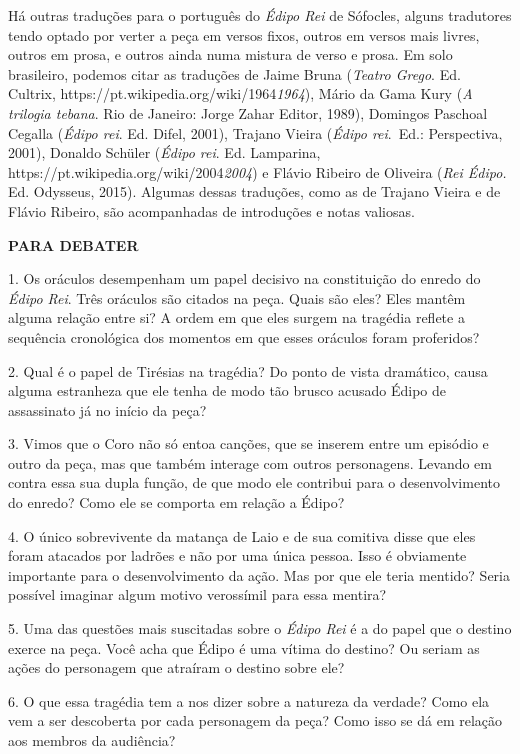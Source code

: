 Há outras traduções para o português do \emph{Édipo Rei} de Sófocles,
alguns tradutores tendo optado por verter a peça em versos fixos, outros
em versos mais livres, outros em prosa, e outros ainda numa mistura de
verso e prosa. Em solo brasileiro, podemos citar as traduções de Jaime
Bruna (\emph{Teatro Grego}. Ed.
Cultrix, {https://pt.wikipedia.org/wiki/1964}{\emph{1964}}), Mário
da Gama Kury (\emph{A trilogia tebana}. Rio de Janeiro: Jorge Zahar
Editor, 1989), Domingos Paschoal Cegalla (\emph{Édipo rei}. Ed. Difel,
2001), Trajano Vieira (\emph{Édipo rei}.~Ed.: Perspectiva, 2001),
Donaldo Schüler (\emph{Édipo rei}. Ed.
Lamparina, {https://pt.wikipedia.org/wiki/2004}{\emph{2004}}) e
Flávio Ribeiro de Oliveira (\emph{Rei Édipo.} Ed. Odysseus, 2015).
Algumas dessas traduções, como as de Trajano Vieira e de Flávio Ribeiro,
são acompanhadas de introduções e notas valiosas.

\textbf{PARA DEBATER}

1. Os oráculos desempenham um papel decisivo na constituição do enredo
do \emph{Édipo Rei}. Três oráculos são citados na peça. Quais são eles?
Eles mantêm alguma relação entre si? A ordem em que eles surgem na
tragédia reflete a sequência cronológica dos momentos em que esses
oráculos foram proferidos?

2. Qual é o papel de Tirésias na tragédia? Do ponto de vista dramático,
causa alguma estranheza que ele tenha de modo tão brusco acusado Édipo
de assassinato já no início da peça?

3. Vimos que o Coro não só entoa canções, que se inserem entre um
episódio e outro da peça, mas que também interage com outros
personagens. Levando em contra essa sua dupla função, de que modo ele
contribui para o desenvolvimento do enredo? Como ele se comporta em
relação a Édipo?

4. O único sobrevivente da matança de Laio e de sua comitiva disse que
eles foram atacados por ladrões e não por uma única pessoa. Isso é
obviamente importante para o desenvolvimento da ação. Mas por que ele
teria mentido? Seria possível imaginar algum motivo verossímil para essa
mentira?

5. Uma das questões mais suscitadas sobre o \emph{Édipo Rei} é a do
papel que o destino exerce na peça. Você acha que Édipo é uma vítima do
destino? Ou seriam as ações do personagem que atraíram o destino sobre
ele?

6. O que essa tragédia tem a nos dizer sobre a natureza da verdade? Como
ela vem a ser descoberta por cada personagem da peça? Como isso se dá em
relação aos membros da audiência?


